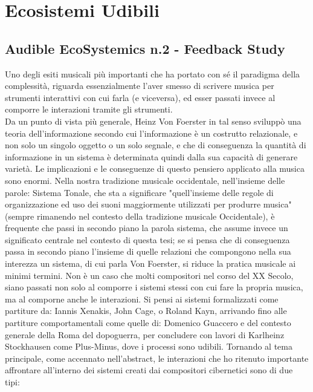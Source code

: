 \section{Ecosistemi Udibili}
\label{sec:Ecosistemi Udibili}

\subsection{Audible EcoSystemics n.2 - Feedback Study}
\label{sec:Audible EcoSystemics n.2 - Feedback Study}

Uno degli esiti musicali più importanti che ha portato con sé 
il paradigma della complessità, riguarda essenzialmente l'aver smesso di 
scrivere musica per strumenti interattivi con cui farla (e viceversa), 
ed esser passati invece al  comporre le interazioni tramite gli strumenti. \\
Da un punto di vista più generale, Heinz Von Foerster in tal senso 
sviluppò una teoria dell'informazione secondo cui l'informazione è un costrutto relazionale, 
e non solo un singolo oggetto o un solo segnale, 
e che di conseguenza la quantità di informazione in un sistema è determinata 
quindi dalla sua capacità di generare varietà.
Le implicazioni e le conseguenze di questo pensiero applicato alla musica sono enormi.
Nella nostra tradizione musicale occidentale, nell'insieme delle parole: Sistema Tonale, 
che sta a significare "quell'insieme delle regole di organizzazione ed uso dei
suoni maggiormente utilizzati per produrre musica" 
(sempre rimanendo nel contesto della tradizione musicale Occidentale), 
è frequente che passi in secondo piano la parola 
sistema, che assume invece un significato centrale nel contesto di questa tesi;
se si pensa che di conseguenza passa in secondo piano l'insieme di quelle relazioni
che compongono nella sua interezza un sistema, di cui parla Von Foerster, 
si riduce la pratica musicale ai minimi termini.
Non è un caso che molti compositori nel corso del XX Secolo, siano passati non solo al comporre 
i sistemi stessi con cui fare la propria musica, ma al comporne anche le interazioni.
Si pensi ai sistemi formalizzati come partiture da: Iannis Xenakis, John Cage, o Roland Kayn,
arrivando fino alle partiture comportamentali come quelle di: Domenico Guaccero e 
del contesto generale della Roma del dopoguerra, per concludere con lavori di 
Karlheinz Stockhausen come Plus-Minus, dove i processi sono udibili.
Tornando al tema principale, come accennato nell'abstract, 
le interazioni che ho ritenuto importante affrontare 
all'interno dei sistemi creati dai compositori cibernetici sono di due tipi:
